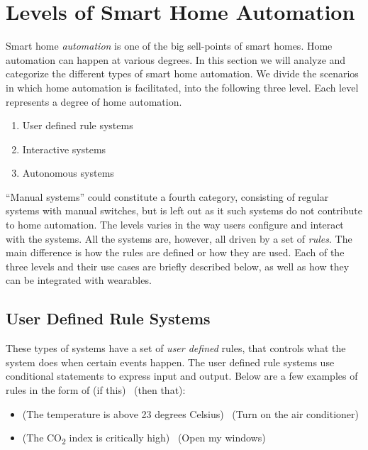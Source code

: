 \section{Levels of Smart Home Automation}\label{sec:system-categories}

Smart home \emph{automation} is one of the big sell-points of smart homes.
Home automation can happen at various degrees. 
In this section we will analyze and categorize the different types of smart home automation. 
We divide the scenarios in which home automation is facilitated, 
into the following three level. Each level represents a degree of home automation.

\begin{enumerate}
    \item User defined rule systems
    \item Interactive systems
    \item Autonomous systems
\end{enumerate}

``Manual systems'' could constitute a fourth category, 
consisting of regular systems with manual switches,
but is left out as it such systems do not contribute to home automation.
The levels varies in the way users configure and interact with the systems. 
All the systems are, however, all driven by a set of \emph{rules}. 
The main difference is how the rules are defined or how they are used.
Each of the three levels and their use cases are briefly described below,
as well as how they can be integrated with wearables.

\subsection{User Defined Rule Systems}

These types of systems have a set of \emph{user defined} rules, 
that controls what the system does when certain events happen. 
The user defined rule systems use conditional statements to express input and output. 
Below are a few examples of rules in the form of (if this) \textrightarrow~(then that):

\begin{itemize}
    \item (The temperature is above 23 degrees Celsius) \textrightarrow~(Turn on the air conditioner)
    \item (The CO\textsubscript{2} index is critically high) \textrightarrow~(Open my windows)
\end{itemize}

